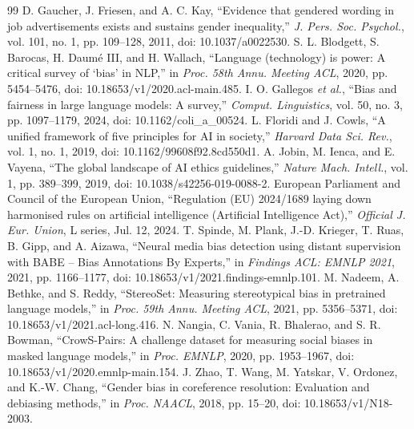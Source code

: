 \documentclass[12pt,a4paper,oneside]{report}
\begin{document}
\clearpage
{}
\renewcommand{\bibname}{References}
\begin{thebibliography}{99}
 D. Gaucher, J. Friesen, and A. C. Kay, ``Evidence that gendered wording in job advertisements exists and sustains gender inequality,'' \textit{J. Pers. Soc. Psychol.}, vol. 101, no. 1, pp. 109--128, 2011, doi: 10.1037/a0022530.
 S. L. Blodgett, S. Barocas, H. Daum\'e III, and H. Wallach, ``Language (technology) is power: A critical survey of `bias' in NLP,'' in \textit{Proc. 58th Annu. Meeting ACL}, 2020, pp. 5454--5476, doi: 10.18653/v1/2020.acl-main.485.
 I. O. Gallegos \textit{et al.}, ``Bias and fairness in large language models: A survey,'' \textit{Comput. Linguistics}, vol. 50, no. 3, pp. 1097--1179, 2024, doi: 10.1162/coli\_a\_00524.
 L. Floridi and J. Cowls, ``A unified framework of five principles for AI in society,'' \textit{Harvard Data Sci. Rev.}, vol. 1, no. 1, 2019, doi: 10.1162/99608f92.8cd550d1.
 A. Jobin, M. Ienca, and E. Vayena, ``The global landscape of AI ethics guidelines,'' \textit{Nature Mach. Intell.}, vol. 1, pp. 389--399, 2019, doi: 10.1038/s42256-019-0088-2.
 European Parliament and Council of the European Union, ``Regulation (EU) 2024/1689 laying down harmonised rules on artificial intelligence (Artificial Intelligence Act),'' \textit{Official J. Eur. Union}, L series, Jul. 12, 2024.
 T. Spinde, M. Plank, J.-D. Krieger, T. Ruas, B. Gipp, and A. Aizawa, ``Neural media bias detection using distant supervision with BABE -- Bias Annotations By Experts,'' in \textit{Findings ACL: EMNLP 2021}, 2021, pp. 1166--1177, doi: 10.18653/v1/2021.findings-emnlp.101.
 M. Nadeem, A. Bethke, and S. Reddy, ``StereoSet: Measuring stereotypical bias in pretrained language models,'' in \textit{Proc. 59th Annu. Meeting ACL}, 2021, pp. 5356--5371, doi: 10.18653/v1/2021.acl-long.416.
 N. Nangia, C. Vania, R. Bhalerao, and S. R. Bowman, ``CrowS-Pairs: A challenge dataset for measuring social biases in masked language models,'' in \textit{Proc. EMNLP}, 2020, pp. 1953--1967, doi: 10.18653/v1/2020.emnlp-main.154.
 J. Zhao, T. Wang, M. Yatskar, V. Ordonez, and K.-W. Chang, ``Gender bias in coreference resolution: Evaluation and debiasing methods,'' in \textit{Proc. NAACL}, 2018, pp. 15--20, doi: 10.18653/v1/N18-2003.

\end{thebibliography}
\end{document}
